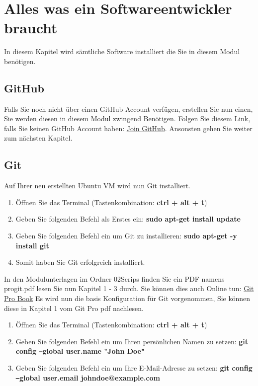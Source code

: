 \section{Alles was ein Softwareentwickler braucht}\label{sec:software}
\begin{frame}[fragile]
    In diesem Kapitel wird sämtliche Software installiert die Sie in diesem Modul benötigen.
\end{frame}

\subsection{GitHub}\label{subsec:github}
\begin{frame}[fragile]
    Falls Sie noch nicht über einen GitHub Account verfügen, erstellen Sie nun einen, Sie werden diesen in diesem Modul
    zwingend Benötigen.
    Folgen Sie diesem Link, falls Sie keinen GitHub Account haben: \href{https://github.com/join}{Join GitHub}.
    Ansonsten gehen Sie weiter zum nächsten Kapitel.
\end{frame}
\newpage

\subsection{Git}\label{subsec:git}
\begin{frame}[fragile]
    Auf Ihrer neu erstellten Ubuntu VM wird nun Git installiert.
    \begin{enumerate}
        \item Öffnen Sie das Terminal (Tastenkombination: \textbf{ctrl + alt + t})
        \item Geben Sie folgenden Befehl als Erstes ein: \textbf{sudo apt-get install update}
        \item Geben Sie folgenden Befehl ein um Git zu installieren: \textbf{sudo apt-get -y install git}
        \item Somit haben Sie Git erfolgreich installiert.
    \end{enumerate}
    In den Modulunterlagen im Ordner 02\textunderscore Scrips finden Sie ein PDF namens progit.pdf lesen Sie nun
    Kapitel 1 - 3 durch.
    Sie können dies auch Online tun: \href{https://git-scm.com/book/en/v2}{Git Pro Book}
    Es wird nun die basis Konfiguration für Git vorgenommen, Sie können diese in Kapitel 1 vom Git Pro pdf nachlesen.
    \begin{enumerate}
        \item Öffnen Sie das Terminal (Tastenkombination: \textbf{ctrl + alt + t})
        \item Geben Sie folgenden Befehl ein um Ihren persönlichen Namen zu setzen: \newline\textbf{git config \texttt{--}global user.name "John Doe"}
        \item Geben Sie folgenden Befehl ein um Ihre E-Mail-Adresse zu setzen: \newline\textbf{git config \texttt{--}global user.email johndoe@example.com}
    \end{enumerate}
\end{frame}

